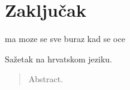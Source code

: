 \documentclass[times, utf8, diplomski]{fer}
\begin{document}
\chapter{Zaključak}
ma moze se sve buraz kad se oce

\listoffigures




\begin{sazetak}
Sažetak na hrvatskom jeziku.

\end{sazetak}

\begin{abstract}
Abstract.

\end{abstract}
\end{document}
